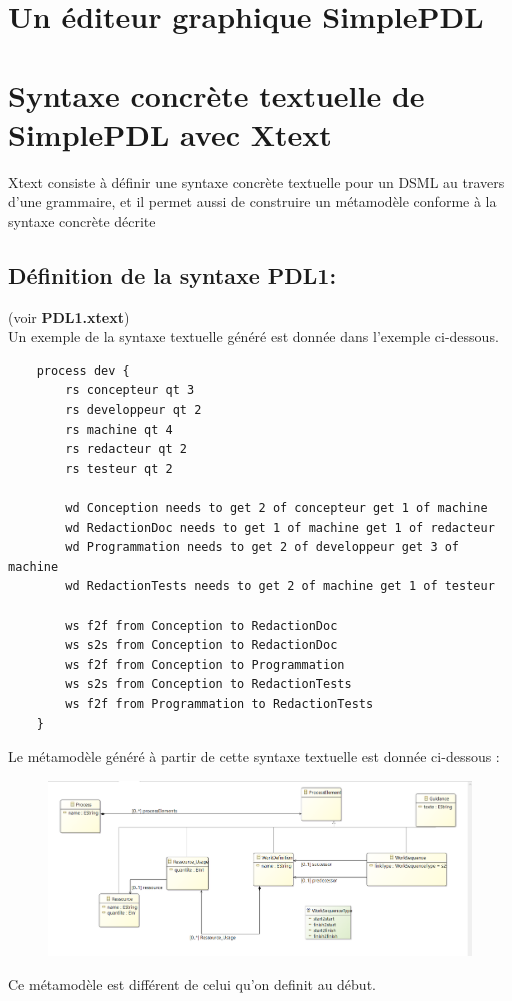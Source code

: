 \documentclass{article}
\begin{document}
\section{Un éditeur graphique SimplePDL}

\section{Syntaxe concrète textuelle de SimplePDL avec Xtext}
Xtext consiste à définir une syntaxe concrète textuelle pour un DSML au travers d’une grammaire, et il permet aussi 
de construire un métamodèle conforme à la syntaxe concrète décrite 
\subsection{Définition de la syntaxe PDL1:}
(voir \textbf{PDL1.xtext}) \\
Un exemple de la syntaxe textuelle généré est donnée dans l'exemple ci-dessous.
\begin{verbatim}
    process dev {
        rs concepteur qt 3
        rs developpeur qt 2
        rs machine qt 4
        rs redacteur qt 2
        rs testeur qt 2
        
        wd Conception needs to get 2 of concepteur get 1 of machine
        wd RedactionDoc needs to get 1 of machine get 1 of redacteur
        wd Programmation needs to get 2 of developpeur get 3 of machine
        wd RedactionTests needs to get 2 of machine get 1 of testeur
        
        ws f2f from Conception to RedactionDoc
        ws s2s from Conception to RedactionDoc
        ws f2f from Conception to Programmation
        ws s2s from Conception to RedactionTests
        ws f2f from Programmation to RedactionTests
    }
\end{verbatim}
Le métamodèle généré à partir de cette syntaxe textuelle est donnée ci-dessous : 
\begin{figure}[H]
    \centering
    \includegraphics[width = 18cm]{SimplePDLXtext.png}
\end{figure}
Ce métamodèle est différent de celui qu'on definit au début.
\end{document}

